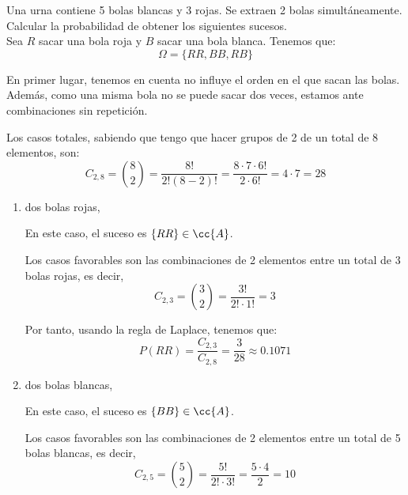 \begin{ejercicio} \label{ej:3.Ejercicio5}
    Una urna contiene 5 bolas blancas y 3 rojas. Se extraen 2 bolas simultáneamente. Calcular la probabilidad de obtener los siguientes sucesos.\\

    Sea $R$ sacar una bola roja y $B$ sacar una bola blanca. Tenemos que:
    \begin{equation*}
        \Omega = \{RR,BB,RB\}
    \end{equation*}

    En primer lugar, tenemos en cuenta no influye el orden en el que sacan las bolas. Además, como una misma bola no se puede sacar dos veces, estamos ante combinaciones sin repetición.   
    
    Los casos totales, sabiendo que tengo que hacer grupos de 2 de un total de 8 elementos, son:
    \begin{equation*}
        C_{2,8} = \binom{8}{2} = \frac{8!}{2!(8-2)!} = \frac{8\cdot 7 \cdot 6!}{2\cdot 6!} = 4\cdot 7 = 28
    \end{equation*}
    
    \begin{enumerate}
        \item dos bolas rojas,

        En este caso, el suceso es $\{RR\}\in \cc{A}$.

        Los casos favorables son las combinaciones de 2 elementos entre un total de 3 bolas rojas, es decir,
        \begin{equation*}
            C_{2,3} = \binom{3}{2} = \frac{3!}{2!\cdot 1!} = 3    
        \end{equation*}

        Por tanto, usando la regla de Laplace, tenemos que:
        \begin{equation*}
            P(RR)=\frac{C_{2,3}}{C_{2,8}} = \frac{3}{28} \approx 0.1071
        \end{equation*}
        
        \item dos bolas blancas,

        En este caso, el suceso es $\{BB\}\in \cc{A}$.
        
        Los casos favorables son las combinaciones de 2 elementos entre un total de 5 bolas blancas, es decir,
        \begin{equation*}
            C_{2,5} = \binom{5}{2} = \frac{5!}{2!\cdot 3!} = \frac{5\cdot 4}{2} = 10    
        \end{equation*}


\end{enumerate}
\end{ejercicio}

